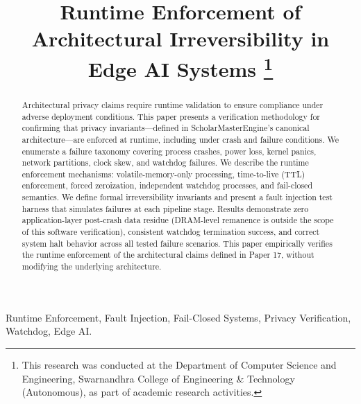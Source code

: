 \documentclass[conference]{IEEEtran}
\begin{document}
\title{Runtime Enforcement of Architectural Irreversibility in Edge AI Systems
\thanks{This research was conducted at the Department of Computer Science and Engineering, Swarnandhra College of Engineering \& Technology (Autonomous), as part of academic research activities.}
}

\author{
}

\maketitle

\begin{abstract}
Architectural privacy claims require runtime validation to ensure compliance under adverse deployment conditions. This paper presents a verification methodology for confirming that privacy invariants---defined in ScholarMasterEngine's canonical architecture---are enforced at runtime, including under crash and failure conditions. We enumerate a failure taxonomy covering process crashes, power loss, kernel panics, network partitions, clock skew, and watchdog failures. We describe the runtime enforcement mechanisms: volatile-memory-only processing, time-to-live (TTL) enforcement, forced zeroization, independent watchdog processes, and fail-closed semantics. We define formal irreversibility invariants and present a fault injection test harness that simulates failures at each pipeline stage. Results demonstrate zero application-layer post-crash data residue (DRAM-level remanence is outside the scope of this software verification), consistent watchdog termination success, and correct system halt behavior across all tested failure scenarios. This paper empirically verifies the runtime enforcement of the architectural claims defined in Paper 17, without modifying the underlying architecture.
\end{abstract}

\begin{IEEEkeywords}
Runtime Enforcement, Fault Injection, Fail-Closed Systems, Privacy Verification, Watchdog, Edge AI.
\end{IEEEkeywords}
\end{document}
